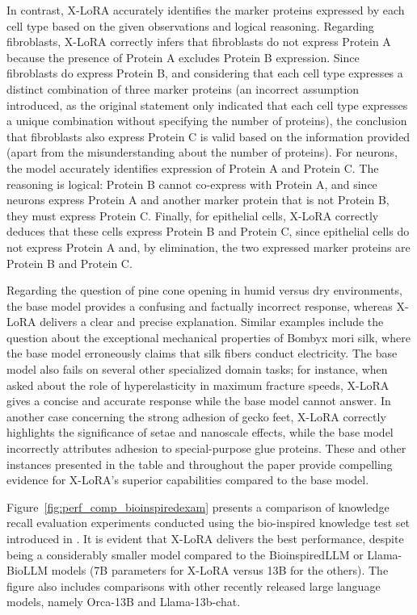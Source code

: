 In contrast, X-LoRA accurately identifies the marker proteins expressed by each cell type based on the given observations and logical reasoning. Regarding fibroblasts, X-LoRA correctly infers that fibroblasts do not express Protein A because the presence of Protein A excludes Protein B expression. Since fibroblasts do express Protein B, and considering that each cell type expresses a distinct combination of three marker proteins (an incorrect assumption introduced, as the original statement only indicated that each cell type expresses a unique combination without specifying the number of proteins), the conclusion that fibroblasts also express Protein C is valid based on the information provided (apart from the misunderstanding about the number of proteins). For neurons, the model accurately identifies expression of Protein A and Protein C. The reasoning is logical: Protein B cannot co-express with Protein A, and since neurons express Protein A and another marker protein that is not Protein B, they must express Protein C. Finally, for epithelial cells, X-LoRA correctly deduces that these cells express Protein B and Protein C, since epithelial cells do not express Protein A and, by elimination, the two expressed marker proteins are Protein B and Protein C.

Regarding the question of pine cone opening in humid versus dry environments, the base model provides a confusing and factually incorrect response, whereas X-LoRA delivers a clear and precise explanation. Similar examples include the question about the exceptional mechanical properties of Bombyx mori silk, where the base model erroneously claims that silk fibers conduct electricity. The base model also fails on several other specialized domain tasks; for instance, when asked about the role of hyperelasticity in maximum fracture speeds, X-LoRA gives a concise and accurate response while the base model cannot answer. In another case concerning the strong adhesion of gecko feet, X-LoRA correctly highlights the significance of setae and nanoscale effects, while the base model incorrectly attributes adhesion to special-purpose glue proteins. These and other instances presented in the table and throughout the paper provide compelling evidence for X-LoRA’s superior capabilities compared to the base model.

Figure~\ref{fig:perf_comp_bioinspiredexam} presents a comparison of knowledge recall evaluation experiments conducted using the bio-inspired knowledge test set introduced in \cite{Luu2023BioinspiredLLM:Materials}. It is evident that X-LoRA delivers the best performance, despite being a considerably smaller model compared to the BioinspiredLLM or Llama-BioLLM models (7B parameters for X-LoRA versus 13B for the others). The figure also includes comparisons with other recently released large language models, namely Orca-13B and Llama-13b-chat.

